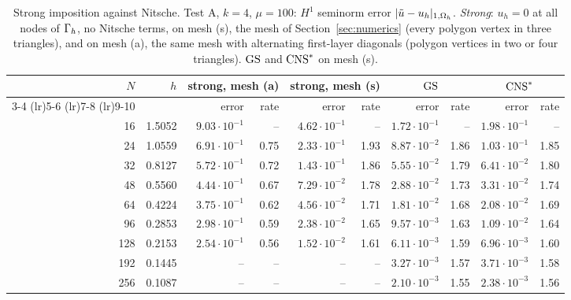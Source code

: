 \begin{table}[t]
\centering
\caption{Strong imposition against Nitsche. Test A, $k=4$, $\mu=100$: $H^1$ seminorm error $|\tilde u-u_h|_{1,\Omega_h}$. \emph{Strong}: $u_h=0$ at all nodes of $\Gamma_h$, no Nitsche terms, on mesh (s), the mesh of Section~\ref{sec:numerics} (every polygon vertex in three triangles), and on mesh (a), the same mesh with alternating first-layer diagonals (polygon vertices in two or four triangles). $\mathrm{GS}$ and $\mathrm{CNS}^\ast$ on mesh (s).}\label{tab:strong}
\small
\begin{tabular}{rrrrrrrrrr}
\toprule
$N$ & $h$ & \multicolumn{2}{c}{strong, mesh (a)} & \multicolumn{2}{c}{strong, mesh (s)} & \multicolumn{2}{c}{$\mathrm{GS}$} & \multicolumn{2}{c}{$\mathrm{CNS}^\ast$}\\
\cmidrule(lr){3-4} \cmidrule(lr){5-6} \cmidrule(lr){7-8} \cmidrule(lr){9-10}
 & & error & rate & error & rate & error & rate & error & rate\\
\midrule
16 & 1.5052 & $9.03\cdot10^{-1}$ & -- & $4.62\cdot10^{-1}$ & -- & $1.72\cdot10^{-1}$ & -- & $1.98\cdot10^{-1}$ & --\\
24 & 1.0559 & $6.91\cdot10^{-1}$ & 0.75 & $2.33\cdot10^{-1}$ & 1.93 & $8.87\cdot10^{-2}$ & 1.86 & $1.03\cdot10^{-1}$ & 1.85\\
32 & 0.8127 & $5.72\cdot10^{-1}$ & 0.72 & $1.43\cdot10^{-1}$ & 1.86 & $5.55\cdot10^{-2}$ & 1.79 & $6.41\cdot10^{-2}$ & 1.80\\
48 & 0.5560 & $4.44\cdot10^{-1}$ & 0.67 & $7.29\cdot10^{-2}$ & 1.78 & $2.88\cdot10^{-2}$ & 1.73 & $3.31\cdot10^{-2}$ & 1.74\\
64 & 0.4224 & $3.75\cdot10^{-1}$ & 0.62 & $4.56\cdot10^{-2}$ & 1.71 & $1.81\cdot10^{-2}$ & 1.68 & $2.08\cdot10^{-2}$ & 1.69\\
96 & 0.2853 & $2.98\cdot10^{-1}$ & 0.59 & $2.38\cdot10^{-2}$ & 1.65 & $9.57\cdot10^{-3}$ & 1.63 & $1.09\cdot10^{-2}$ & 1.64\\
128 & 0.2153 & $2.54\cdot10^{-1}$ & 0.56 & $1.52\cdot10^{-2}$ & 1.61 & $6.11\cdot10^{-3}$ & 1.59 & $6.96\cdot10^{-3}$ & 1.60\\
192 & 0.1445 & -- & -- & -- & -- & $3.27\cdot10^{-3}$ & 1.57 & $3.71\cdot10^{-3}$ & 1.58\\
256 & 0.1087 & -- & -- & -- & -- & $2.10\cdot10^{-3}$ & 1.55 & $2.38\cdot10^{-3}$ & 1.56\\
\bottomrule
\end{tabular}
\end{table}

